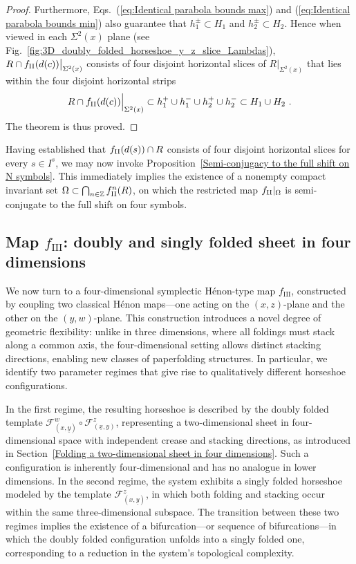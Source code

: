 \documentclass[12pt]{iopart}
\begin{document}
\begin{proof}
Furthermore, Eqs.~(\ref{eq:Identical parabola bounds max}) and (\ref{eq:Identical parabola bounds min}) also guarantee that $h^{\pm}_1 \subset H_1$ and $h^{\pm}_2 \subset H_2$. Hence when viewed in each $\Sigma^2(x)$ plane (see Fig.~\ref{fig:3D_doubly_folded_horseshoe_y_z_slice_Lambdas}), $R \cap f_{\rm II}(d(c))\big|_{\Sigma^2(x)}$ consists of four disjoint horizontal slices of $R\big|_{\Sigma^2(x)}$ that lies within the four disjoint horizontal strips 
\begin{equation}\label{eq:V intersects f_II D y z slice second bound}
R \cap f_{\rm II}(d(c)) \Big|_{\Sigma^2(x)} \subset h^{+}_1\cup h^{-}_1 \cup h^{+}_2 \cup h^{-}_2 \subset H_1 \cup H_2 \ . 
\end{equation}
The theorem is thus proved.
\end{proof}

Having established that \( f_{\rm II}(d(s)) \cap R \) consists of four disjoint horizontal slices for every \( s \in I^s \), we may now invoke Proposition~\ref{Semi-conjugacy to the full shift on N symbols}. This immediately implies the existence of a nonempty compact invariant set \( \Omega \subset \bigcap_{n \in \mathbb{Z}} f_{\rm II}^n(R) \), on which the restricted map \( f_{\rm II}|_\Omega \) is semi-conjugate to the full shift on four symbols.




\subsection{Map \( f_{\mathrm{III}} \): doubly and singly folded sheet in four dimensions}
\label{f III}

We now turn to a four-dimensional symplectic H\'{e}non-type map \( f_{\mathrm{III}} \), constructed by coupling two classical H\'{e}non maps—one acting on the \( (x,z) \)-plane and the other on the \( (y,w) \)-plane. This construction introduces a novel degree of geometric flexibility: unlike in three dimensions, where all foldings must stack along a common axis, the four-dimensional setting allows distinct stacking directions, enabling new classes of paperfolding structures. In particular, we identify two parameter regimes that give rise to qualitatively different horseshoe configurations.

In the first regime, the resulting horseshoe is described by the doubly folded template \( \mathcal{F}^w_{(x,\underline{y})} \circ \mathcal{F}^z_{(\underline{x},y)} \), representing a two-dimensional sheet in four-dimensional space with independent crease and stacking directions, as introduced in Section~\ref{Folding a two-dimensional sheet in four dimensions}. Such a configuration is inherently four-dimensional and has no analogue in lower dimensions. In the second regime, the system exhibits a singly folded horseshoe modeled by the template \( \mathcal{F}^z_{(x,\underline{y})} \), in which both folding and stacking occur within the same three-dimensional subspace. The transition between these two regimes implies the existence of a bifurcation—or sequence of bifurcations—in which the doubly folded configuration unfolds into a singly folded one, corresponding to a reduction in the system's topological complexity.
\end{document}

